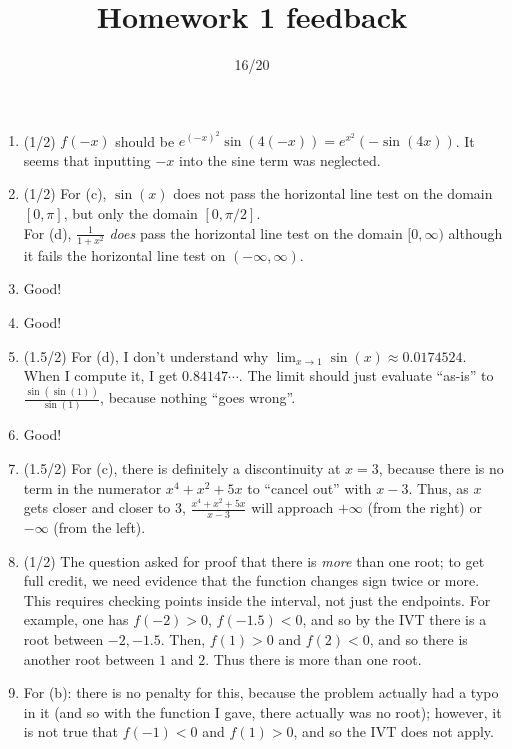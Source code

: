 \documentclass{article}
\title{Homework 1 feedback}
\author{}
\date{16/20}
\begin{document}
\maketitle
\begin{enumerate}
	\item (1/2) $f(-x)$ should be $e^{(-x)^{2}} \sin(4(-x)) = e^{x^{2}} (- \sin(4x))$. It seems that inputting $-x$ into the sine term was neglected.
	\item (1/2) For (c), $\sin(x)$ does not pass the horizontal line test on the domain $[0, \pi]$, but only the domain $[0, \pi/2]$.\\
		For (d), $\frac{1}{1+x^{2}}$ \emph{does} pass the horizontal line test on the domain $[0, \infty)$ although it fails the horizontal line test on $(-\infty, \infty)$.
	\item Good!
	\item Good!
	\item (1.5/2) For (d), I don't understand why $\lim_{x \to 1} \sin(x) \approx 0.0174524$. When I compute it, I get $0.84147\cdots$. The limit should just evaluate ``as-is'' to $\frac{\sin(\sin(1))}{\sin(1)}$, because nothing ``goes wrong''.
	\item Good!
	\item (1.5/2) For (c), there is definitely a discontinuity at $x=3$, because there is no term in the numerator $x^{4} + x^{2} + 5x$ to ``cancel out'' with $x-3$. Thus, as $x$ gets closer and closer to 3, $\frac{x^{4} + x^{2} + 5x}{x-3}$ will approach $+\infty$ (from the right) or $-\infty$ (from the left).
	\item (1/2) The question asked for proof that there is \emph{more} than one root; to get full credit, we need evidence that the function changes sign twice or more. This requires checking points inside the interval, not just the endpoints. For example, one has $f(-2) > 0$, $f(-1.5) < 0$, and so by the IVT there is a root between $-2, -1.5$. Then, $f(1) > 0$ and $f(2) < 0$, and so there is another root between $1$ and $2$. Thus there is more than one root.
	\item For (b): there is no penalty for this, because the problem actually had a typo in it (and so with the function I gave, there actually was no root); however, it is not true that $f(-1) < 0$ and $f(1) > 0$, and so the IVT does not apply. 
\end{enumerate}
\end{document}

